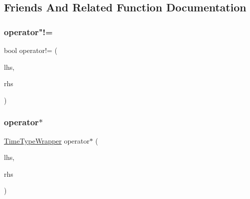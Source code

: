 \subsection{Friends And Related Function Documentation}
\mbox{\label{structvt_1_1_time_type_wrapper_af262df7ce230a03a6d8834cda01ffce2}} 
\subsubsection{\texorpdfstring{operator"!=}{operator!=}}
{\footnotesize\ttfamily bool operator!= (\begin{DoxyParamCaption}\item[{const \hyperlink{structvt_1_1_time_type_wrapper}{Time\+Type\+Wrapper} \&}]{lhs,  }\item[{const \hyperlink{structvt_1_1_time_type_wrapper}{Time\+Type\+Wrapper} \&}]{rhs }\end{DoxyParamCaption})\hspace{0.3cm}{\ttfamily [friend]}}

\mbox{\label{structvt_1_1_time_type_wrapper_ac8858e68561056ede6fe89732125f11f}} 
\subsubsection{\texorpdfstring{operator$\ast$}{operator*}\hspace{0.1cm}{\footnotesize\ttfamily [1/3]}}
{\footnotesize\ttfamily \hyperlink{structvt_1_1_time_type_wrapper}{Time\+Type\+Wrapper} operator$\ast$ (\begin{DoxyParamCaption}\item[{const \hyperlink{structvt_1_1_time_type_wrapper}{Time\+Type\+Wrapper} \&}]{lhs,  }\item[{const \hyperlink{structvt_1_1_time_type_wrapper}{Time\+Type\+Wrapper} \&}]{rhs }\end{DoxyParamCaption})\hspace{0.3cm}{\ttfamily [friend]}}

\mbox{\label{structvt_1_1_time_type_wrapper_ab7cc197fd53b7a7a5b8fd78d9f4f5a25}} 
